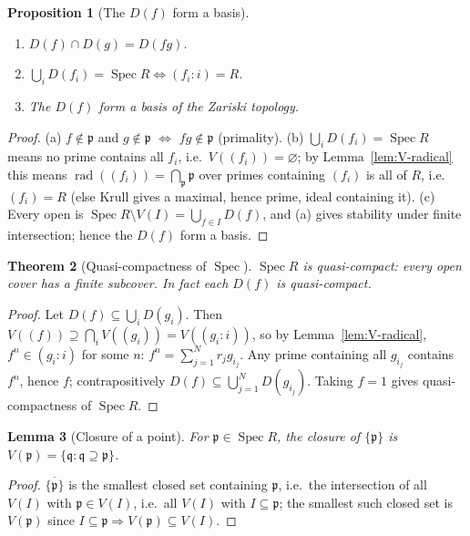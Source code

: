 \documentclass[11pt,a4paper]{article}
\newtheorem{theorem}{Theorem}[section]
\newtheorem{lemma}[theorem]{Lemma}
\newtheorem{proposition}[theorem]{Proposition}
\theoremstyle{definition}
\newcommand{\Spec}{\operatorname{Spec}}
\newcommand{\rad}{\operatorname{rad}}
\newcommand{\p}{\mathfrak{p}}
\newcommand{\q}{\mathfrak{q}}
\begin{document}
	\begin{proposition}[The $D(f)$ form a basis]\label{prop:Df-basis}
		\begin{enumerate}[label=(\alph*)]
			\item $D(f)\cap D(g)=D(fg)$.
			\item $\bigcup_i D(f_i)=\Spec R \iff (f_i: i)=R$.
			\item The $D(f)$ form a basis of the Zariski topology.
		\end{enumerate}
	\end{proposition}
	\begin{proof}
		(a) $f\notin\p$ and $g\notin\p$ $\iff$ $fg\notin\p$ (primality).
		(b) $\bigcup_i D(f_i)=\Spec R$ means no prime contains all $f_i$, i.e.\ $V((f_i))=\varnothing$; by
		Lemma~\ref{lem:V-radical} this means $\rad((f_i))=\bigcap_{\p}\p$ over primes containing $(f_i)$ is all of $R$,
		i.e.\ $(f_i)=R$ (else Krull gives a maximal, hence prime, ideal containing it).
		(c) Every open is $\Spec R\setminus V(I)=\bigcup_{f\in I}D(f)$, and (a) gives stability under finite
		intersection; hence the $D(f)$ form a basis.
	\end{proof}
	
	\begin{theorem}[Quasi-compactness of $\Spec$]\label{thm:qc}
		$\Spec R$ is quasi-compact: every open cover has a finite subcover. In fact each $D(f)$ is quasi-compact.
	\end{theorem}
	\begin{proof}
		Let $D(f)\subseteq\bigcup_i D(g_i)$. Then $V((f))\supseteq\bigcap_i V((g_i))=V((g_i:i))$, so by
		Lemma~\ref{lem:V-radical}, $f^n\in(g_i:i)$ for some $n$: $f^n=\sum_{j=1}^N r_j g_{i_j}$. Any prime
		containing all $g_{i_j}$ contains $f^n$, hence $f$; contrapositively $D(f)\subseteq\bigcup_{j=1}^N D(g_{i_j})$.
		Taking $f=1$ gives quasi-compactness of $\Spec R$.
	\end{proof}
	
	\begin{lemma}[Closure of a point]\label{lem:closure}
		For $\p\in\Spec R$, the closure of $\{\p\}$ is $V(\p)=\{\q:\q\supseteq\p\}$.
	\end{lemma}
	\begin{proof}
		$\overline{\{\p\}}$ is the smallest closed set containing $\p$, i.e.\ the intersection of all $V(I)$
		with $\p\in V(I)$, i.e.\ all $V(I)$ with $I\subseteq\p$; the smallest such closed set is $V(\p)$ since
		$I\subseteq\p\Rightarrow V(\p)\subseteq V(I)$.
	\end{proof}
	
\end{document}
